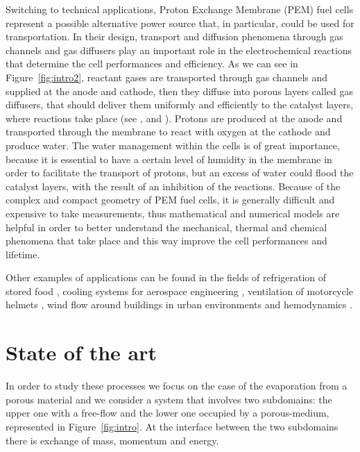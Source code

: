 Switching to technical applications, Proton Exchange Membrane (PEM) fuel cells 
represent a possible alternative power source that, in particular, could be 
used for transportation. In their design, transport and diffusion phenomena 
through gas channels and gas diffusers play an important role in the 
electrochemical reactions that determine the cell performances and efficiency. 
As we can see in Figure~\ref{fig:intro2}, reactant gases are transported 
through gas channels and supplied at the anode and cathode, then they diffuse 
into porous layers called gas diffusers, that should deliver them uniformly and 
efficiently to the catalyst layers, where reactions take place (see 
\cite{wu:fuelcell}, \cite{tesi:baber} and \cite{tesi:pem}). Protons are 
produced at the anode and transported through the membrane to react with oxygen 
at the cathode and produce water. The water management within the cells is of 
great importance, because it is essential to have a certain level of humidity in 
the membrane in order to facilitate the transport of protons, but an excess of 
water could flood the catalyst layers, with the result of an inhibition of the 
reactions.
Because of the complex and compact geometry of PEM fuel cells, it is generally 
difficult and expensive to take measurements, thus mathematical and numerical 
models are helpful in order to better understand the mechanical, thermal and 
chemical phenomena that take place and this way improve the cell performances 
and lifetime.

Other examples of applications can be found in the fields of refrigeration of 
stored food \cite{intro:food}, cooling systems for aerospace engineering 
\cite{intro:aero}, ventilation of motorcycle helmets \cite{intro:discacim}, 
wind flow around buildings in urban environments \cite{intro:buildings} and 
hemodynamics \cite{intro:med}.

\section{State of the art}
In order to study these processes we focus on
the case of the evaporation from a porous material and we consider
a system that 
involves two subdomains: the upper one with a free-flow and the lower one 
occupied by a porous-medium, represented in Figure~\ref{fig:intro}.
At the interface between the two subdomains there is exchange of mass, momentum 
and energy.

